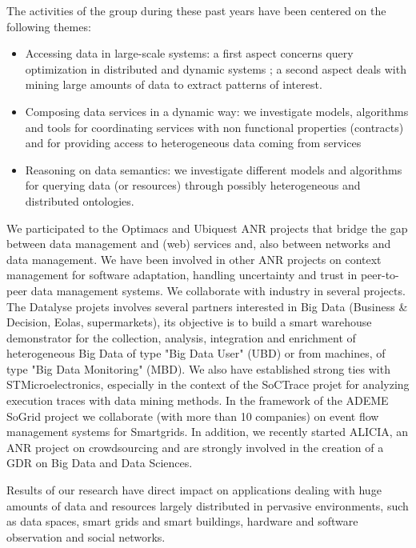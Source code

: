 The activities of the group during these past years have been centered on the following themes:
\begin{itemize}
\item  Accessing data in large-scale systems: a first aspect concerns query optimization in distributed and dynamic systems ; a second aspect deals with mining large amounts of data to extract patterns of interest.
\item  Composing data services in a dynamic way:  we investigate models, algorithms and tools for coordinating services with non functional properties (contracts) and for providing access to heterogeneous data coming from services
\item  Reasoning on data semantics: we investigate different models and  algorithms  for querying data (or resources) through  possibly heterogeneous and distributed ontologies.
\end{itemize}

We participated to the Optimacs and Ubiquest ANR projects that bridge the gap between data management and (web) services and, also  between networks and data management.   
We have been involved in other ANR projects on context management for software adaptation, handling uncertainty and trust in peer-to-peer data management systems. We collaborate with industry in several projects. The Datalyse projets involves several partners interested in Big Data (Business \& Decision, Eolas, supermarkets), its objective is to build a smart warehouse demonstrator for the collection, analysis, integration and enrichment of heterogeneous Big Data  of type "Big Data User" (UBD) or from machines, of type "Big Data Monitoring" (MBD).   We also have established strong ties with STMicroelectronics, especially in the context of the SoCTrace projet for analyzing execution traces with data mining methods. In the framework of the ADEME SoGrid project we collaborate (with more than 10 companies) on  event flow management systems for Smartgrids.  In addition,  we recently started ALICIA, an ANR project on crowdsourcing and are strongly involved in the creation of a GDR on Big Data and Data Sciences.  

Results of our research have direct impact on applications dealing with huge amounts of data and resources largely distributed in pervasive environments, such as data spaces, smart grids and smart buildings, hardware and software observation and social networks.


